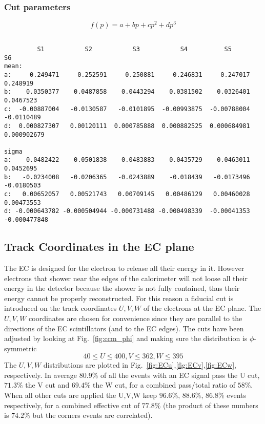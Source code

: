 \subsubsection{Cut parameters}\label{sec:ecp_parameters}
$$
f(p) = a + bp + cp^2 + dp^3
$$
\begin{verbatim}   

         S1           S2           S3           S4          S5            S6
mean:
a:     0.249471     0.252591     0.250881     0.246831     0.247017     0.248919
b:    0.0350377    0.0487858    0.0443294    0.0381502    0.0326401    0.0467523
c:  -0.00887004   -0.0130587   -0.0101895  -0.00993875  -0.00788004   -0.0110489
d:  0.000827307   0.00120111  0.000785888  0.000882525  0.000684981  0.000902679

sigma 
a:    0.0482422    0.0501838    0.0483883    0.0435729    0.0463011    0.0452695
b:   -0.0234008   -0.0206365   -0.0243889    -0.018439   -0.0173496   -0.0180503
c:   0.00652057   0.00521743   0.00709145   0.00486129   0.00460028   0.00473553
d: -0.000643782 -0.000504944 -0.000731488 -0.000498339  -0.00041353 -0.000477848
\end{verbatim}

\clearpage\newpage
\subsection{Track Coordinates in the EC plane}
The EC is designed for the electron to release all their energy in it.
However electrons that shower near the edges of the calorimeter will not loose
all their energy in the detector because the shower is not fully contained,
thus their energy cannot be properly reconstructed. For this reason 
a fiducial cut is introduced on the track coordinates $U,V,W$ 
of the electrons at the EC plane. The $U,V,W$ coordinates are chosen for 
convenience since they are parallel to the directions of the EC scintillators 
(and to the EC edges). The cuts have been adjusted by looking at Fig.~\ref{fig:ccm_phi}
and making sure the distribution is $\phi$-symmetric
$$
 40\leq U\leq400, V\leq362, W\leq395
$$
The $U,V,W$ distributions are plotted in Fig.~\ref{fig:ECu},\ref{fig:ECv},\ref{fig:ECw},
respectively. In average $80.9\%$ of all the events with an EC signal pass the U cut, $71.3\%$ the V cut
and $69.4\%$ the W cut, for a combined pass/total ratio of $58\%$.  When all other cuts are applied
the U,V,W keep $96.6\%$, $88.6\%$, $86.8\%$ events respectively, for a combined effective cut of $77.8\%$
(the product of these numbers is  $74.2\%$ but the corners events are correlated).

